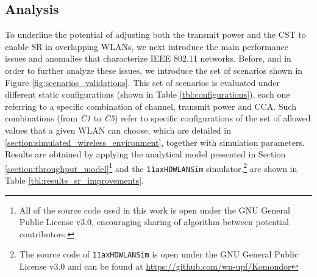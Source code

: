 \documentclass[preprint,12pt]{elsarticle}
\begin{document}

\subsection{Analysis}
\label{section:spatial_reuse_enhancement}  
To underline the potential of adjusting both the transmit power and the CST to enable SR in overlapping WLANs, we next introduce the main performance issues and anomalies that characterize IEEE 802.11 networks. Before, and in order to further analyze these issues, we introduce the set of scenarios shown in Figure \ref{fig:scenarios_validations}. This set of scenarios is evaluated under different static configurations (shown in Table \ref{tbl:configurations}), each one referring to a specific combination of channel, transmit power and CCA. Such combinations (from \emph{C1} to \emph{C5}) refer to specific configurations of the set of allowed values that a given WLAN can choose, which are detailed in \ref{section:simulated_wireless_environment}, together with simulation parameters. Results are obtained by applying the analytical model presented in Section \ref{section:throughput_model}\footnote{All of the source code used in this work is open \cite{fwilhelmi2018code} under the GNU General Public License v3.0, encouraging sharing of algorithm between potential contributors.} and the \texttt{11axHDWLANSim} simulator.\footnote{The source code of \texttt{11axHDWLANSim} is open under the GNU General Public License v3.0 and can be found at \url{https://github.com/wn-upf/Komondor}} are shown in Table \ref{tbl:results_sr_improvements}.
\end{document}
